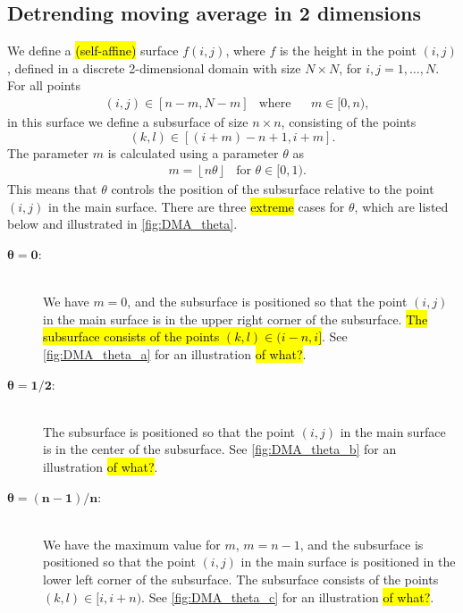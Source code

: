 \subsection{Detrending moving average in 2 dimensions}
We define a \hl{(self-affine)} surface $f(i,j)$, where $f$ is the height in the point $(i,j)$, defined in a discrete 2-dimensional domain with size $N\times N$, for $i,j = 1,\dots,N$. For all points
\begin{align*}
    &(i,j)\in [n-m, N-m] &\text{where}& &m\in [0, n),
\end{align*}
in this surface we define a subsurface of size $n \times n$, consisting of the points
\[
    (k,l) \in [(i+m)-n+1, i+m].
\]
The parameter $m$ is calculated using a parameter $\theta$ as
\begin{align*}
    &m = \left \lfloor n\theta \right \rfloor &\text{for }
    \theta \in [0,1).
\end{align*}
This means that $\theta$ controls the position of the subsurface relative to the point $(i,j)$ in the main surface. There are three \hl{extreme} cases for $\theta$, which are listed below and illustrated in \cref{fig:DMA_theta}.%
%
\begin{description}%
    \item[$\bm{\theta = 0}$:] \hfill\\%
        We have $m=0$, and the subsurface is positioned so that the point $(i,j)$ in the main surface is in the upper right corner of the subsurface. %
        \hl{The subsurface consists of the points $(k,l) \in (i-n, i]$}. %
        See \cref{fig:DMA_theta_a} for an illustration \hl{of what?}.%
    \item[$\bm{\theta = 1/2}$:] \hfill\\%
        The subsurface is positioned so that the point $(i,j)$ in the main surface is in the center of the subsurface. %
        See \cref{fig:DMA_theta_b} for an illustration \hl{of what?}.%
    \item[$\bm{\theta = (n-1)/n}$:] \hfill\\%
        {\sloppy%
        We have the maximum value for $m$, $m=n-1$, and the subsurface is positioned so that the point $(i,j)$ in the main surface is positioned in the lower left corner of the subsurface. %
        The subsurface consists of the points $(k,l) \in [i, i+n)$. %
        See \cref{fig:DMA_theta_c} for an illustration \hl{of what?}.%
        }%
\end{description}%
